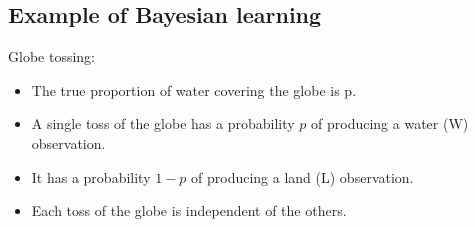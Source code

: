 \documentclass[letterpaper,10pt,english]{jupyterBook}
\begin{document}
\subsection{Example of Bayesian learning}
\label{\detokenize{Lecture 2:example-of-bayesian-learning}}
\sphinxAtStartPar
Globe tossing:
\begin{itemize}
\item {} 
\sphinxAtStartPar
The true proportion of water covering the globe is p.

\item {} 
\sphinxAtStartPar
A single toss of the globe has a probability \(p\) of producing a water (W) observation.

\item {} 
\sphinxAtStartPar
It has a probability \(1 − p\) of producing a land (L) observation.

\item {} 
\sphinxAtStartPar
Each toss of the globe is independent of the others.

\end{itemize}
\end{document}
